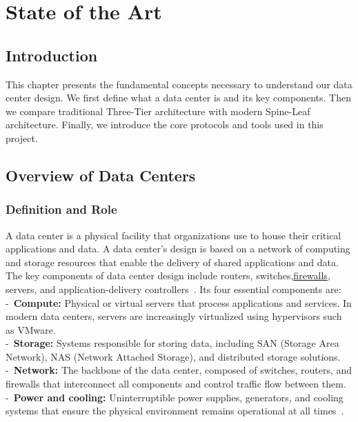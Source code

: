 \chapter{State of the Art}

\section{Introduction}
This chapter presents the fundamental concepts necessary to understand our data center design. We first define what a data center is and its key components. Then we compare traditional Three-Tier architecture with modern Spine-Leaf architecture. Finally, we introduce the core protocols and tools used in this project.

\section{Overview of Data Centers}

\subsection{Definition and Role}
A data center is a physical facility that organizations use to house their critical applications and data. A data center's design is based on a network of computing and storage resources that enable the delivery of shared applications and data. The key components of data center design include routers, switches,\hyperref[def:firewall]{\underline{firewalls}}, servers, and application-delivery controllers~\cite{cisco}.
Its four essential components are:\\
  -\ \textbf{Compute:} Physical or virtual servers that process applications and services. In modern data centers, servers are increasingly virtualized using hypervisors such as VMware.\\
  -\ \textbf{Storage:} Systems responsible for storing data, including SAN (Storage Area Network), NAS (Network Attached Storage), and distributed storage solutions.\\
  -\ \textbf{Network:} The backbone of the data center, composed of switches, routers, and firewalls that interconnect all components and control traffic flow between them.\\
  -\ \textbf{Power and cooling:} Uninterruptible power supplies, generators, and cooling systems that ensure the physical environment remains operational at all times~\cite{dc}.\\
   
